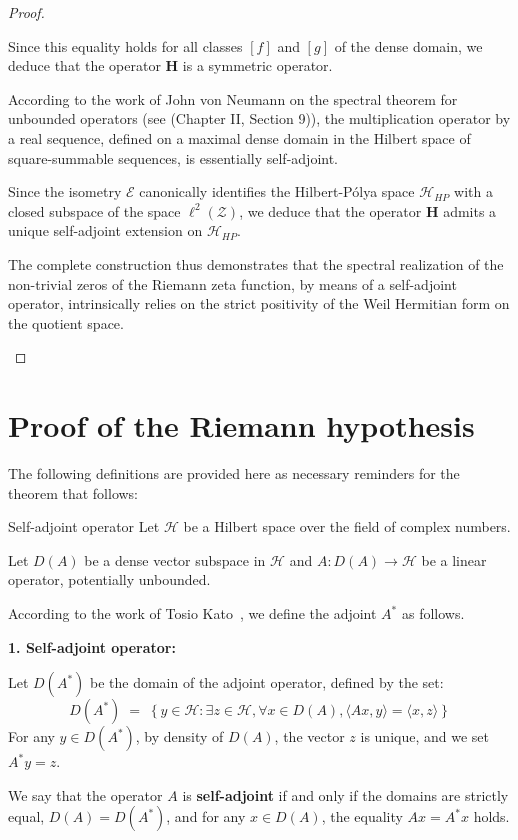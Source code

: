 \documentclass[Riemann_Hypothesis.tex]{subfiles}
\begin{document}
\begin{proof}
\begin{part_proof}
        Since this equality holds for all classes $[f]$ and $[g]$ of the dense domain, we deduce that the operator $\mathbf{H}$ is a symmetric operator. \par
        According to the work of John von Neumann on the spectral theorem for unbounded 
        operators (see\cite{vonneumann_quantum_en} (Chapter II, Section 9)), the multiplication operator by a real sequence, defined on a maximal dense domain in the Hilbert space of square-summable sequences, is essentially self-adjoint. \par
        Since the isometry $\mathcal{E}$ canonically identifies the Hilbert-Pólya space $\mathcal{H}_{HP}$ with a closed subspace of the space $\ell^2(\mathcal{Z})$, we deduce that the operator $\mathbf{H}$ admits a unique self-adjoint extension on $\mathcal{H}_{HP}$. \par
        The complete construction thus demonstrates that the spectral realization of the non-trivial zeros of the Riemann zeta function, by means of a self-adjoint operator, intrinsically relies on the strict positivity of the Weil Hermitian form on the quotient space.
    \end{part_proof}

\end{proof}

\color{red}
\section{Proof of the Riemann hypothesis}
\color{black}

The following definitions are provided here as necessary reminders 
for the theorem that follows:

\begin{DefNefEn}[label=df:OperateurAutoAdjointResolvante]{Self-adjoint operator}
    Let $\mathcal{H}$ be a Hilbert space over the field of complex numbers. \par
    Let $D(A)$ be a dense vector subspace in $\mathcal{H}$ and $A : D(A) \to \mathcal{H}$ be a linear operator, potentially unbounded. \par
    According to the work of Tosio Kato~\cite{kato1995_perturbation_en}, 
    we define the adjoint $A^*$ as follows. \par
    \vspace{0.2cm}
    \textbf{1. Self-adjoint operator:} \par
    Let $D(A^*)$ be the domain of the adjoint operator, defined by the set:
    \begin{equation*}
        D(A^*) \;=\; \left\{ y \in \mathcal{H} : \exists z \in \mathcal{H}, \forall x \in D(A), \langle Ax, y \rangle = \langle x, z \rangle \right\}
    \end{equation*}
    For any $y \in D(A^*)$, by density of $D(A)$, the vector $z$ is unique, and we set $A^*y = z$. \par
    We say that the operator $A$ is \textbf{self-adjoint} if and only if the domains are strictly equal, $D(A) = D(A^*)$, and for any $x \in D(A)$, the equality $Ax = A^*x$ holds. \par
\end{DefNefEn}
\end{document}
